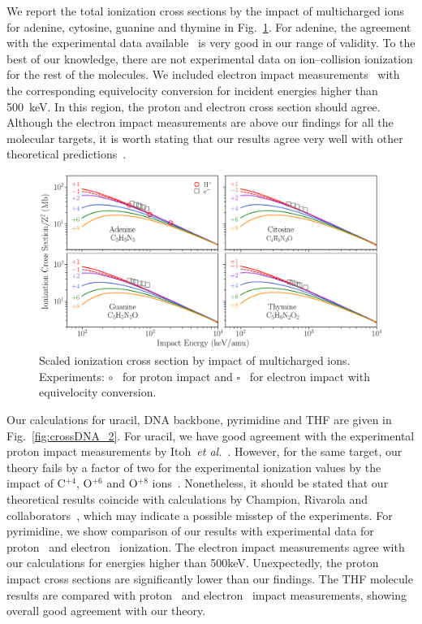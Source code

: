 \documentclass[preprint,12pt]{article}
\begin{document}
We report the total ionization cross sections by the impact of 
multicharged ions for adenine, cytosine, guanine and thymine in 
Fig.~\ref{fig:crossDNA_1}. For adenine, the agreement with the 
experimental data available~\cite{iriki2011} is very good 
in our range of validity. To the best of our knowledge, there are not 
experimental data on ion--collision ionization for the rest of the 
molecules. We included electron impact measurements~\cite{rahman2016} 
with the corresponding equivelocity 
conversion for incident energies higher than 500~keV. In this region, 
the proton and electron cross section should agree. Although the electron 
impact measurements are above our findings for all the molecular targets, 
it is worth stating that our results agree very well with other 
theoretical predictions~\cite{mozejko2003,tan2018}. 

\begin{figure}[t!]
\centering
\includegraphics[width=\textwidth]{figuras/adn1.eps}
\caption{Scaled ionization cross section by impact of multicharged ions. 
Experiments: 
$\circ$~\cite{iriki2011} for proton impact and $\square$~\cite{rahman2016} 
for electron impact with equivelocity conversion.}
\label{fig:crossDNA_1}
\end{figure} 

Our calculations for uracil, DNA backbone, pyrimidine and THF are given in 
Fig.~\ref{fig:crossDNA_2}. 
For uracil, we have good agreement with the experimental 
proton impact measurements by Itoh~{\it et al.}~\cite{itoh2013}. 
However, for the same target, our theory fails by a factor of two for 
the experimental ionization values by the impact of 
C$^{+4}$, O$^{+6}$ and O$^{+8}$ ions~\cite{agnihotri2012,agnihotri2013}.
Nonetheless, it should be stated that our theoretical results coincide 
with calculations by Champion, Rivarola and 
collaborators~\cite{agnihotri2012,champion2012}, which may indicate a 
possible misstep of the experiments. 
For pyrimidine, we show comparison of our results with experimental data
for proton~\cite{wolff2014} and electron~\cite{bug2017} ionization. 
The electron impact measurements 
agree with our calculations for energies higher than 500keV. 
Unexpectedly, the proton impact cross sections are significantly lower 
than our findings. 
The THF molecule results are compared with proton~\cite{wang2016} 
and electron~\cite{bug2017,wolf2019,fuss2009} impact measurements, showing
overall good agreement with our theory. 
\end{document}
